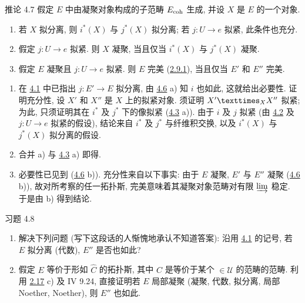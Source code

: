\begin{enonce*}{推论 4.7}
假定 $E$ 中由凝聚对象构成的子范畴 $E_{\mathrm{coh}}$ 生成,
并设 $X$ 是 $E$ 的一个对象.
\begin{enumerate}
\renewcommand{\theenumi}{\alph{enumi}}
\renewcommand{\labelenumi}{\theenumi)}
\item 若 $X$ 拟分离, 则 $i^{\ast}(X)$ 与 $j^{\ast}(X)$ 拟分离;
若 $j:U\to e$ 拟紧, 此条件也充分.

\item 假定 $j:U\to e$ 拟紧.
则 $X$ 凝聚, 当且仅当 $i^{\ast}(X)$ 与 $j^{\ast}(X)$ 凝聚.

\item 假定 $E$ 凝聚且 $j:U\to e$ 拟紧.
则 $E$ 完美 (\hyperref[VI.def2.9.1]{2.9.1}),
当且仅当 $E'$ 和 $E''$ 完美.
\end{enumerate}
\end{enonce*}

\begin{enumerate}
\renewcommand{\theenumi}{\alph{enumi}}
\renewcommand{\labelenumi}{\theenumi)}
\item 在 \hyperref[VI.subsec4.1]{4.1} 中已指出 $j:E'\to E$ 拟分离,
由 \hyperref[VI.prop4.6]{4.6} a) 知 $i$ 也如此,
这就给出必要性.
证明充分性, 设 $X'$ 和 $X''$ 是 $X$ 上的拟紧对象.
须证明 $\fprod{X'}{X''}{X}$ 拟紧;
为此\pageoriginale{}, 只须证明其在 $i^{\ast}$ 及 $j^{\ast}$ 下的像拟紧
(\hyperref[VI.cor4.3]{4.3} a)).
由于 $i$ 及 $j$ 拟紧
(由 \hyperref[VI.prop4.2]{4.2} 及 $j:U\to e$ 拟紧的假设),
结论来自 $i^{\ast}$ 及 $j^{\ast}$ 与纤维积交换,
以及 $i^{\ast}(X)$ 与 $j^{\ast}(X)$ 拟分离的假设.

\item 合并 a) 与 \hyperref[VI.cor4.3]{4.3} a) 即得.

\item 必要性已见到 (\hyperref[VI.prop4.6]{4.6} b)).
充分性来自以下事实:
由于 $E$ 凝聚, $E'$ 与 $E''$ 凝聚
(\hyperref[VI.prop4.6]{4.6} b)),
故对所考察的任一拓扑斯,
完美意味着其凝聚对象范畴对有限 $\varinjlim$ 稳定.
于是由 b) 得到结论.
\end{enumerate}

\begin{enonce*}[remark]{习题 4.8}
\begin{enumerate}
\renewcommand{\theenumi}{\alph{enumi}}
\renewcommand{\labelenumi}{\theenumi)}
\item 解决下列问题
(写下这段话的人惭愧地承认不知道答案):
沿用 \hyperref[VI.subsec4.1]{4.1} 的记号,
若 $E$ 拟分离 (\resp 代数), $E''$ 是否也如此?

\item 假定 $E$ 等价于形如 $\widehat{C}$ 的拓扑斯,
其中 $C$ 是等价于某个 $\in 𝒰$ 的范畴的范畴.
利用 \hyperref[VI.exer2.17]{2.17} c) 及 IV 9.24,
直接证明若 $E$ 局部凝聚
(\resp 凝聚, \resp 代数, \resp 拟分离,
\resp 局部 Noether, \resp Noether),
则 $E''$ 也如此.
\end{enumerate}
\end{enonce*}

